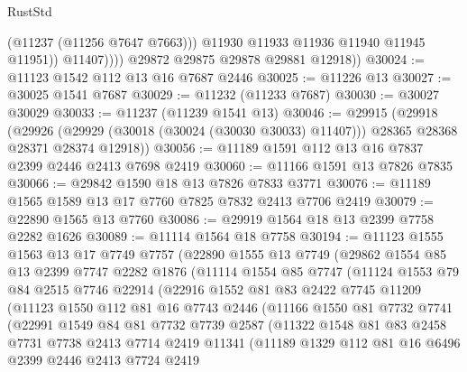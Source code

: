 \begin{lexlean}{RustStd}
\begin{coremodule}
                      (@11237 (@11256 @7647 @7663)))
                    @11930
                    @11933
                    @11936
                    @11940
                    @11945
                    @11951))
                @11407))))
        @29872
        @29875
        @29878
        @29881
        @12918))
@30024 := @11123 @1542 @112 @13 @16 @7687 @2446
@30025 := @11226 @13
@30027 := @30025 @1541 @7687
@30029 := @11232 (@11233 @7687)
@30030 := @30027 @30029
@30033 := @11237 (@11239 @1541 @13)
@30046 := @29915
    (@29918
      (@29926 (@29929 (@30018 (@30024 (@30030 @30033) @11407))) @28365 @28368 @28371 @28374 @12918))
@30056 := @11189 @1591 @112 @13 @16 @7837 @2399 @2446 @2413 @7698 @2419
@30060 := @11166 @1591 @13 @7826 @7835
@30066 := @29842 @1590 @18 @13 @7826 @7833 @3771
@30076 := @11189 @1565 @1589 @13 @17 @7760 @7825 @7832 @2413 @7706 @2419
@30079 := @22890 @1565 @13 @7760
@30086 := @29919 @1564 @18 @13 @2399 @7758 @2282 @1626
@30089 := @11114 @1564 @18 @7758
@30194 := @11123
    @1555
    @1563
    @13
    @17
    @7749
    @7757
    (@22890
      @1555
      @13
      @7749
      (@29862
        @1554
        @85
        @13
        @2399
        @7747
        @2282
        @1876
        (@11114
          @1554
          @85
          @7747
          (@11124
            @1553
            @79
            @84
            @2515
            @7746
            @22914
            (@22916
              @1552
              @81
              @83
              @2422
              @7745
              @11209
              (@11123
                @1550
                @112
                @81
                @16
                @7743
                @2446
                (@11166
                  @1550
                  @81
                  @7732
                  @7741
                  (@22991
                    @1549
                    @84
                    @81
                    @7732
                    @7739
                    @2587
                    (@11322
                      @1548
                      @81
                      @83
                      @2458
                      @7731
                      @7738
                      @2413
                      @7714
                      @2419
                      @11341
                      (@11189
                        @1329
                        @112
                        @81
                        @16
                        @6496
                        @2399
                        @2446
                        @2413
                        @7724
                        @2419

\end{coremodule}
\end{lexlean}
